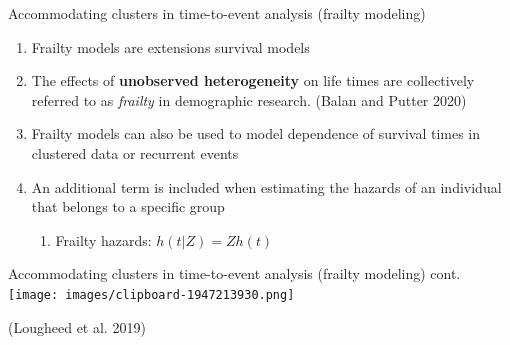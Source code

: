 \documentclass[
  ignorenonframetext,
]{beamer}
\providecommand{\tightlist}{%
  \setlength{\itemsep}{0pt}\setlength{\parskip}{0pt}}
\begin{document}
\begin{frame}{Accommodating clusters in time-to-event analysis (frailty
modeling)}
\label{accommodating-clusters-in-time-to-event-analysis-frailty-modeling}
\begin{enumerate}
\tightlist
\item
  Frailty models are extensions survival models
\item
  The effects of \textbf{unobserved heterogeneity} on life times are
  collectively referred to as \emph{frailty} in demographic research.
  (Balan and Putter 2020)
\item
  Frailty models can also be used to model dependence of survival times
  in clustered data or recurrent events
\item
  An additional term is included when estimating the hazards of an
  individual that belongs to a specific group

  \begin{enumerate}
  \tightlist
  \item
    Frailty hazards: \(h(t|Z)=Zh(t)\)
  \end{enumerate}
\end{enumerate}
\end{frame}

\begin{frame}{Accommodating clusters in time-to-event analysis (frailty
modeling) cont.}
\label{accommodating-clusters-in-time-to-event-analysis-frailty-modeling-cont.}
\texttt{[image: images/clipboard-1947213930.png]}

(Lougheed et al. 2019)
\end{frame}
\end{document}
